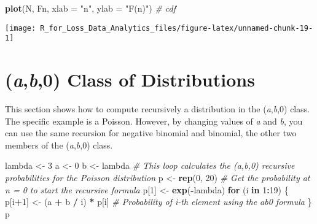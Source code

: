 \documentclass[]{book}
\newenvironment{Shaded}{\begin{snugshade}}{\end{snugshade}}
\newcommand{\KeywordTok}[1]{\textcolor[rgb]{0.13,0.29,0.53}{\textbf{#1}}}
\newcommand{\DataTypeTok}[1]{\textcolor[rgb]{0.13,0.29,0.53}{#1}}
\newcommand{\DecValTok}[1]{\textcolor[rgb]{0.00,0.00,0.81}{#1}}
\newcommand{\StringTok}[1]{\textcolor[rgb]{0.31,0.60,0.02}{#1}}
\newcommand{\CommentTok}[1]{\textcolor[rgb]{0.56,0.35,0.01}{\textit{#1}}}
\newcommand{\ControlFlowTok}[1]{\textcolor[rgb]{0.13,0.29,0.53}{\textbf{#1}}}
\newcommand{\OperatorTok}[1]{\textcolor[rgb]{0.81,0.36,0.00}{\textbf{#1}}}
\newcommand{\NormalTok}[1]{#1}
\theoremstyle{definition}
\theoremstyle{definition}
\theoremstyle{definition}
\theoremstyle{remark}
\begin{document}
\begin{Shaded}
\begin{Highlighting}[]
\KeywordTok{plot}\NormalTok{(N, Fn, }\DataTypeTok{xlab =} \StringTok{"n"}\NormalTok{, }\DataTypeTok{ylab =} \StringTok{"F(n)"}\NormalTok{)  }\CommentTok{# cdf}
\end{Highlighting}
\end{Shaded}

\begin{center}\texttt{[image: R\_for\_Loss\_Data\_Analytics\_files/figure-latex/unnamed-chunk-19-1]} \end{center}

\section{\texorpdfstring{(\emph{a},\emph{b},0) Class of
Distributions}{(a,b,0) Class of Distributions}}\label{ab0-class-of-distributions}

This section shows how to compute recursively a distribution in the
(\emph{a},\emph{b},0) class. The specific example is a Poisson. However,
by changing values of \emph{a} and \emph{b}, you can use the same
recursion for negative binomial and binomial, the other two members of
the (\emph{a},\emph{b},0) class.

\begin{Shaded}
\begin{Highlighting}[]
\NormalTok{lambda <-}\StringTok{ }\DecValTok{3}
\NormalTok{a <-}\StringTok{ }\DecValTok{0}
\NormalTok{b <-}\StringTok{ }\NormalTok{lambda}
\CommentTok{# This loop calculates the (a,b,0) recursive probabilities for the Poisson distribution}
\NormalTok{p <-}\StringTok{ }\KeywordTok{rep}\NormalTok{(}\DecValTok{0}\NormalTok{, }\DecValTok{20}\NormalTok{)}
\CommentTok{# Get the probability at n = 0 to start the recursive formula }
\NormalTok{p[}\DecValTok{1}\NormalTok{] <-}\StringTok{ }\KeywordTok{exp}\NormalTok{(}\OperatorTok{-}\NormalTok{lambda)}
\ControlFlowTok{for}\NormalTok{ (i }\ControlFlowTok{in} \DecValTok{1}\OperatorTok{:}\DecValTok{19}\NormalTok{)}
\NormalTok{  \{}
\NormalTok{  p[i}\OperatorTok{+}\DecValTok{1}\NormalTok{] <-}\StringTok{ }\NormalTok{(a }\OperatorTok{+}\StringTok{ }\NormalTok{b }\OperatorTok{/}\StringTok{ }\NormalTok{i) }\OperatorTok{*}\StringTok{ }\NormalTok{p[i]  }\CommentTok{# Probability of i-th element using the ab0 formula}
\NormalTok{  \}}
\NormalTok{p}
\end{Highlighting}
\end{Shaded}
\end{document}
